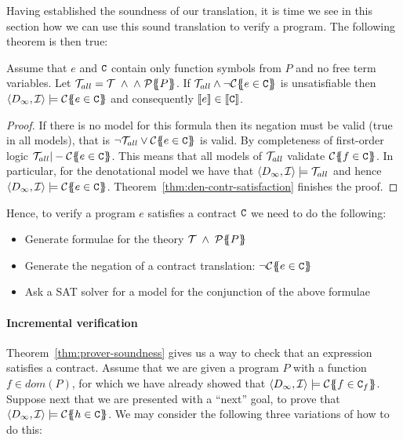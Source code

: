 Having established the soundness of our translation, it is time 
we see in this section how we can use this sound translation to verify a program. 
The following theorem is then true:

\begin{theorem}[Soundness]\label{thm:prover-soundness}
Assume that $e$ and $\Ct$ contain only function symbols from $P$ and no free term variables.
Let $\Th_{all} = \Th\;\land\;\land\;\ptrans{}{P}$. 
If $\Th_{all} \land \neg\ctrans{\Sigma}{P}{e \in \Ct}$ is unsatisfiable 
then $\langle D_\infty,{\cal I}\rangle \models \ctrans{\Sigma}{P}{e \in \Ct}$ and 
consequently $\dbrace{e} \in \dbrace{\Ct}$.
\end{theorem}
\begin{proof}
If there is no model for this formula then its negation must be valid (true in all models), that 
is $ \neg \Th_{all} \lor \ctrans{\Sigma}{P}{e \in \Ct}$ is valid. By completeness
of first-order logic $\Th_{all} |- \ctrans{\Sigma}{P}{e \in \Ct}$. This means 
that all models of $\Th_{all}$ validate $\ctrans{\Sigma}{P}{f \in \Ct}$. In particular, 
for the denotational model we have that $\langle D_\infty,{\cal I}\rangle \models \Th_{all}$ 
and hence $\langle D_\infty,{\cal I} \rangle \models \ctrans{\Sigma}{P}{e \in \Ct}$. 
Theorem~\ref{thm:den-contr-satisfaction} finishes the proof.
\end{proof}

Hence, to verify a program $e$ satisfies a contract $\Ct$ we need to do the following:
\begin{itemize}
  \item Generate formulae for the theory $\Th\;\land\;\ptrans{}{P}$
  \item Generate the negation of a contract translation: $\neg\ctrans{\Sigma}{P}{e \in \Ct}$
  \item Ask a SAT solver for a model for the conjunction of the above formulae
\end{itemize}

\paragraph{Incremental verification}

Theorem~\ref{thm:prover-soundness} gives us a way to check that an expression satisfies a 
contract. Assume that we are given a program $P$ with a function $f \in dom(P)$, for which 
we have already showed that $\langle D_\infty,{\cal I}\rangle \models \ctrans{\Sigma}{P}{f \in \Ct_f}$.
Suppose next that we are presented with a ``next'' goal, to prove that 
$\langle D_\infty,{\cal I}\rangle \models \ctrans{\Sigma}{P}{h \in \Ct}$. 
We may consider the following three variations of how to do this:

